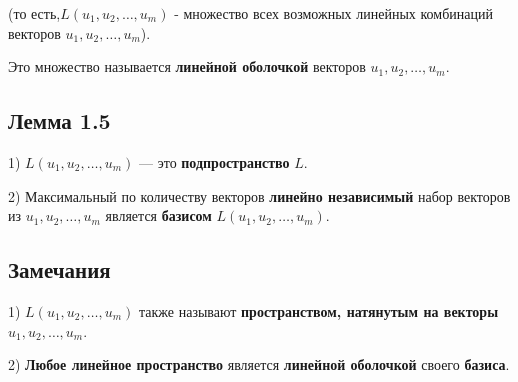 {(то есть,\(L(u_1, u_2, \dots , u_m )\) - множество всех возможных линейных комбинаций векторов  \( u_1, u_2, \dots, u_m\)).

Это множество называется \textbf{линейной оболочкой} векторов \( u_1, u_2, \dots, u_m \).

\subsection*{Лемма 1.5}

1) \( L(u_1, u_2, \dots, u_m) \) — это \textbf{подпространство} \( L \).

2) Максимальный по количеству векторов \textbf{линейно независимый} набор векторов из \( u_1, u_2, \dots, u_m \) является \textbf{базисом} \( L(u_1, u_2, \dots, u_m) \).

\subsection*{Замечания}

1) \( L(u_1, u_2, \ldots, u_m) \) также называют \textbf{пространством, натянутым на векторы} \( u_1, u_2, \ldots, u_m \).

2) \textbf{Любое линейное пространство} является \textbf{линейной оболочкой} своего \textbf{базиса}.


}